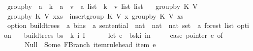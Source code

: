 \begin{isabellebody}
\isanewline
{}\isamarkupfalse%
\ group{\isacharunderscore}{\kern0pt}by\ {\isacharcolon}{\kern0pt}{\isacharcolon}{\kern0pt}\ {\isachardoublequoteopen}{\isacharparenleft}{\kern0pt}{\isacharprime}{\kern0pt}a\ {\isasymRightarrow}\ {\isacharprime}{\kern0pt}k{\isacharparenright}{\kern0pt}\ {\isasymRightarrow}\ {\isacharparenleft}{\kern0pt}{\isacharprime}{\kern0pt}a\ {\isasymRightarrow}\ {\isacharprime}{\kern0pt}v{\isacharparenright}{\kern0pt}\ {\isasymRightarrow}\ {\isacharprime}{\kern0pt}a\ list\ {\isasymRightarrow}\ {\isacharparenleft}{\kern0pt}{\isacharprime}{\kern0pt}k\ {\isasymtimes}\ {\isacharprime}{\kern0pt}v\ list{\isacharparenright}{\kern0pt}\ list{\isachardoublequoteclose}\ \isanewline
\ \ {\isachardoublequoteopen}group{\isacharunderscore}{\kern0pt}by\ K\ V\ {\isacharbrackleft}{\kern0pt}{\isacharbrackright}{\kern0pt}\ {\isacharequal}{\kern0pt}\ {\isacharbrackleft}{\kern0pt}{\isacharbrackright}{\kern0pt}{\isachardoublequoteclose}\isanewline
{\isacharbar}{\kern0pt}\ {\isachardoublequoteopen}group{\isacharunderscore}{\kern0pt}by\ K\ V\ {\isacharparenleft}{\kern0pt}x{\isacharhash}{\kern0pt}xs{\isacharparenright}{\kern0pt}\ {\isacharequal}{\kern0pt}\ insert{\isacharunderscore}{\kern0pt}group\ K\ V\ x\ {\isacharparenleft}{\kern0pt}group{\isacharunderscore}{\kern0pt}by\ K\ V\ xs{\isacharparenright}{\kern0pt}{\isachardoublequoteclose}\isanewline
%
\isadelimproof
%
\endisadelimproof
%
\isatagproof
%
\endisatagproof
{\isafoldproof}%
%
\isadelimproof
\isanewline
%
\endisadelimproof
{}\isamarkupfalse%
\ {\isacharparenleft}{\kern0pt}option{\isacharparenright}{\kern0pt}\ build{\isacharunderscore}{\kern0pt}trees{\isacharprime}{\kern0pt}\ {\isacharcolon}{\kern0pt}{\isacharcolon}{\kern0pt}\ {\isachardoublequoteopen}{\isacharprime}{\kern0pt}a\ bins\ {\isasymRightarrow}\ {\isacharprime}{\kern0pt}a\ sentential\ {\isasymRightarrow}\ nat\ {\isasymRightarrow}\ nat\ {\isasymRightarrow}\ nat\ set\ {\isasymRightarrow}\ {\isacharprime}{\kern0pt}a\ forest\ list\ option{\isachardoublequoteclose}\ \isanewline
\ \ {\isachardoublequoteopen}build{\isacharunderscore}{\kern0pt}trees{\isacharprime}{\kern0pt}\ bs\ {\isasymomega}\ k\ i\ I\ {\isacharequal}{\kern0pt}\ {\isacharparenleft}{\kern0pt}\isanewline
\ \ \ \ let\ e\ {\isacharequal}{\kern0pt}\ bs{\isacharbang}{\kern0pt}k{\isacharbang}{\kern0pt}i\ in\ {\isacharparenleft}{\kern0pt}\isanewline
\ \ \ \ case\ pointer\ e\ of\isanewline
\ \ \ \ \ \ Null\ {\isasymRightarrow}\ Some\ {\isacharparenleft}{\kern0pt}{\isacharbrackleft}{\kern0pt}FBranch\ {\isacharparenleft}{\kern0pt}item{\isacharunderscore}{\kern0pt}rule{\isacharunderscore}{\kern0pt}head\ {\isacharparenleft}{\kern0pt}item\ e{\isacharparenright}{\kern0pt}{\isacharparenright}{\kern0pt}\ {\isacharbrackleft}{\kern0pt}{\isacharbrackright}{\kern0pt}{\isacharbrackright}{\kern0pt}{\isacharparenright}{\kern0pt}\isanewline

\end{isabellebody}
